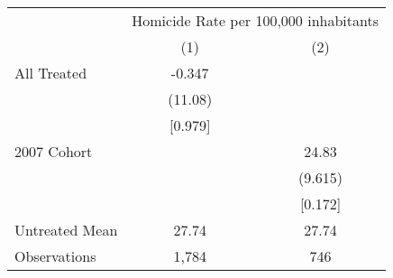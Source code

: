 \documentclass[]{article}
\begin{document}
\begin{table}[htbp]
\centering
\begin{tabular}{lcc}
\toprule
& \multicolumn{2}{c}{Homicide Rate per 100,000 inhabitants} \\
\cmidrule(lr){2-3}
& (1) & (2) \\
\midrule
All Treated & -0.347 & \\
& (11.08) & \\
& [0.979] & \\
[1ex]
2007 Cohort & & 24.83 \\
& & (9.615) \\
&& [0.172] \\
\midrule
Untreated Mean & 27.74 & 27.74 \\
\midrule
Observations & 1,784 & 746 \\
\bottomrule
\end{tabular}
\end{table}
\end{document}
